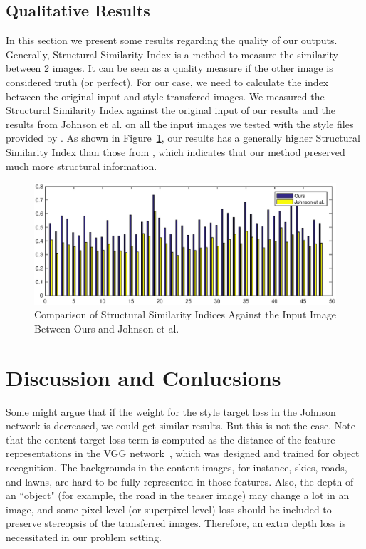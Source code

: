 \documentclass[10pt,twocolumn,letterpaper]{article}
\begin{document}
\subsection{Qualitative Results}
In this section we present some results regarding the quality of our outputs. Generally, Structural Similarity Index is a method to measure the similarity between 2 images. It can be seen as a quality measure if the other image is considered truth (or perfect). For our case, we need to calculate the index between the original input and style transfered images. We measured the Structural Similarity Index against the original input of our results and the results from Johnson et al. \cite{johnson2016perceptual} on all the input images we tested with the style files provided by \cite{johnson2016perceptual}.
As shown in Figure~\ref{fig:ssim}, our results has a generally higher Structural Similarity Index than those from \cite{johnson2016perceptual}, which indicates that our method preserved much more structural information.

\begin{figure}
\centering
\includegraphics[scale=0.7]{ssim.eps}
\caption{Comparison of Structural Similarity Indices Against the Input Image Between Ours and Johnson et al. \cite{johnson2016perceptual}}
\label{fig:ssim}
\end{figure}

\section{Discussion and Conlucsions}

Some might argue that if the weight for the style target loss in the Johnson \etal~\cite{johnson2016perceptual} network is decreased, we could get similar results. But this is not the case. Note that the content target loss term is computed as the distance of the feature representations in the VGG network~\cite{simonyan2014very}, which was designed and trained for object recognition. The backgrounds in the content images, for instance, skies, roads, and lawns, are hard to be fully represented in those features. Also, the depth of an ``object" (for example, the road in the teaser image) may change a lot in an image, and some pixel-level (or superpixel-level) loss should be included to preserve stereopsis of the transferred images. Therefore, an extra depth loss is necessitated in our problem setting.  
\end{document}
